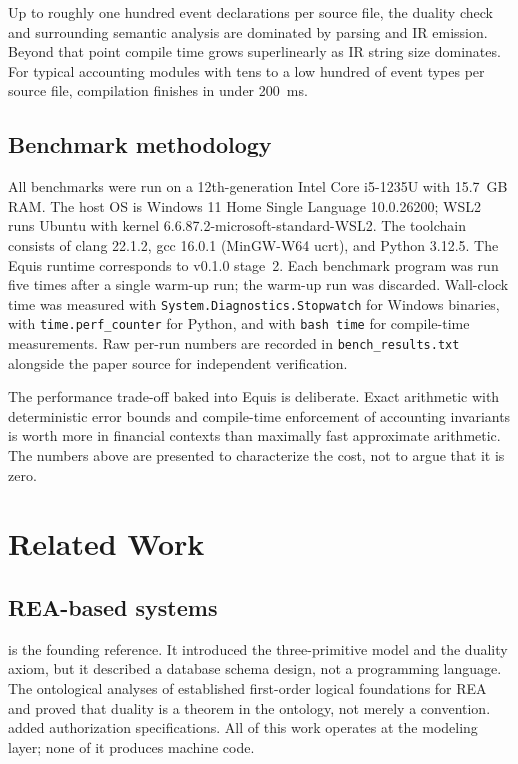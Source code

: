 \documentclass[11pt,a4paper]{article}
\theoremstyle{remark}
\begin{document}
Up to roughly one hundred event declarations per source file, the
duality check and surrounding semantic analysis are dominated by
parsing and IR emission. Beyond that point compile time grows
superlinearly as IR string size dominates. For typical accounting
modules with tens to a low hundred of event types per source file,
compilation finishes in under 200~ms.

\subsection{Benchmark methodology}

All benchmarks were run on a 12th-generation Intel Core i5-1235U with
15.7~GB RAM. The host OS is Windows 11 Home Single Language 10.0.26200;
WSL2 runs Ubuntu with kernel 6.6.87.2-microsoft-standard-WSL2. The
toolchain consists of clang 22.1.2, gcc 16.0.1 (MinGW-W64 ucrt), and
Python 3.12.5. The Equis runtime corresponds to v0.1.0 stage~2. Each
benchmark program was run five times after a single warm-up run; the
warm-up run was discarded. Wall-clock time was measured with
\texttt{System.Diagnostics.Stopwatch} for Windows binaries, with
\texttt{time.perf\_counter} for Python, and with \texttt{bash time}
for compile-time measurements. Raw per-run numbers are recorded in
\texttt{bench\_results.txt} alongside the paper source for independent
verification.

The performance trade-off baked into Equis is deliberate. Exact
arithmetic with deterministic error bounds and compile-time enforcement
of accounting invariants is worth more in financial contexts than
maximally fast approximate arithmetic. The numbers above are presented
to characterize the cost, not to argue that it is zero.

\section{Related Work}\label{sec:related}

\subsection{REA-based systems}

\citet{mccarthy_rea_1982} is the founding reference. It introduced the
three-primitive model and the duality axiom, but it described a
database schema design, not a programming language. The ontological
analyses of \citet{geerts_ontological_1999,geerts_ontological_2002}
established first-order logical foundations for REA and proved that
duality is a theorem in the ontology, not merely a convention.
\citet{geerts_policy-level_2006} added authorization specifications. All of
this work operates at the modeling layer; none of it produces machine
code.
\end{document}
